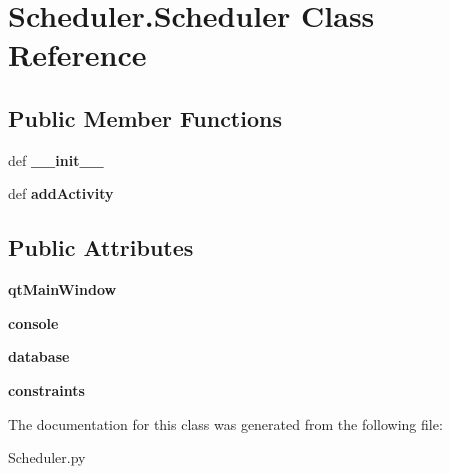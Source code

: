 \hypertarget{classScheduler_1_1Scheduler}{\section{Scheduler.\-Scheduler Class Reference}
\label{classScheduler_1_1Scheduler}
}
\subsection*{Public Member Functions}
\begin{DoxyCompactItemize}
\item 
\hypertarget{classScheduler_1_1Scheduler_a4fe53057fd9abcf7be5accf58d8d8581}{def {\bfseries \-\_\-\-\_\-init\-\_\-\-\_\-}}\label{classScheduler_1_1Scheduler_a4fe53057fd9abcf7be5accf58d8d8581}

\item 
\hypertarget{classScheduler_1_1Scheduler_a564dfa584d5369be1bb95263fdf01227}{def {\bfseries add\-Activity}}\label{classScheduler_1_1Scheduler_a564dfa584d5369be1bb95263fdf01227}

\end{DoxyCompactItemize}
\subsection*{Public Attributes}
\begin{DoxyCompactItemize}
\item 
\hypertarget{classScheduler_1_1Scheduler_a3195eae6797c4d4fbdda1c70d7fbdde5}{{\bfseries qt\-Main\-Window}}\label{classScheduler_1_1Scheduler_a3195eae6797c4d4fbdda1c70d7fbdde5}

\item 
\hypertarget{classScheduler_1_1Scheduler_afb572141c16b677dbd4665907c59fc25}{{\bfseries console}}\label{classScheduler_1_1Scheduler_afb572141c16b677dbd4665907c59fc25}

\item 
\hypertarget{classScheduler_1_1Scheduler_a386637a091ac39683ba009a19be08b80}{{\bfseries database}}\label{classScheduler_1_1Scheduler_a386637a091ac39683ba009a19be08b80}

\item 
\hypertarget{classScheduler_1_1Scheduler_a4406548dfef2709fd5803c7fc9daa8ac}{{\bfseries constraints}}\label{classScheduler_1_1Scheduler_a4406548dfef2709fd5803c7fc9daa8ac}

\end{DoxyCompactItemize}


The documentation for this class was generated from the following file\-:\begin{DoxyCompactItemize}
\item 
Scheduler.\-py\end{DoxyCompactItemize}
